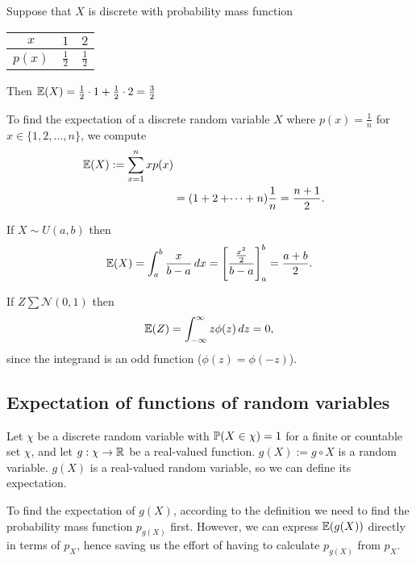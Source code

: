 \documentclass[10pt, a4paper]{article}
\begin{document}
\begin{example}
    Suppose that $X$ is discrete with probability mass function
    \begin{table}[H]
        \centering
        \begin{tabular}{c|cc}
             $x$ & $1$ & $2$ \\
             \hline
             $p(x)$ & $\frac{1}{2}$ & $\frac{1}{2}$
        \end{tabular}
    \end{table}
    Then $\E(X) = \frac{1}{2} \cdot 1 + \frac{1}{2} \cdot 2 = \frac{3}{2}$
\end{example}

\begin{example}
    To find the expectation of a discrete random variable $X$ where $p(x) = \frac{1}{n}$ for $x \in \{1, 2, \dotsc, n\}$,
    we compute
    \begin{align*}
        \E(X) := \sum_{x = 1}^{n}xp(x) \\
        &= (1 + 2 + \dotsi + n)\frac{1}{n} = \frac{n + 1}{2}.
    \end{align*}
\end{example}

\begin{example}
    If $X \sim U(a, b)$ then
    \[
    \E(X) = \int_a^b\frac{x}{b - a}\,dx = \left[\frac{\frac{x ^ 2}{2}}{b - a}\right]_a^b = \frac{a + b}{2}.
    \]
\end{example}

\begin{example}
    If $Z \sum \mathcal{N}(0, 1)$ then
    \[
    \E(Z) = \int_{-\infty}^{\infty}z\phi(z)\,dz = 0,
    \]
    since the integrand is an odd function
    ($\phi(z) = \phi(-z)$).
\end{example}

\subsection{Expectation of functions of random variables}

Let $\chi$ be a discrete random variable with $\P(X \in \chi) = 1$ for a finite or countable set $\chi$,
and let $g : \chi \rightarrow \R$ be a real-valued function.
$g(X) := g \circ X$ is a random variable.
$g(X)$ is a real-valued random variable,
so we can define its expectation.

To find the expectation of $g(X)$,
according to the definition we need to find the probability mass function $p_{g(X)}$ first.
However,
we can express $\E(g(X))$ directly in terms of $p_X$,
hence saving us the effort of having to calculate $p_{g(X)}$ from $p_X$.
\end{document}
